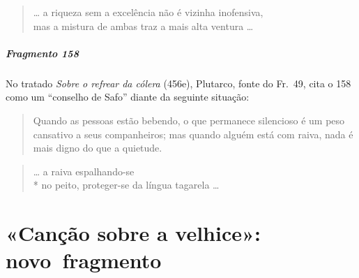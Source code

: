 \begin{verse}
\ldots{} a riqueza sem a excelência não é vizinha inofensiva,\\
mas a mistura de ambas traz a mais alta ventura \ldots{}
\end{verse}

\paragraph{Fragmento 158}

{\small No tratado \textit{Sobre o refrear da cólera} (456e), Plutarco, fonte do Fr.~49, cita o
158 como um ``conselho de Safo” diante da seguinte situação:

\begin{quote}
Quando as pessoas estão bebendo, o que permanece silencioso é um peso
cansativo a seus companheiros; mas quando alguém está com raiva, nada é mais
digno do que a quietude.
\end{quote}}

\begin{verse}
\ldots{} a raiva espalhando-se \\*
no peito, proteger-se da língua tagarela \ldots{}
\end{verse}

\chapter{«Canção sobre a velhice»: novo~fragmento}

